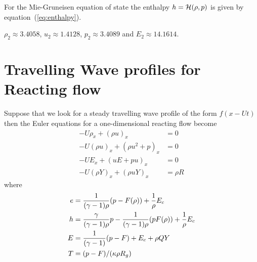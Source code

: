 \documentclass{article}
\begin{document}
For the 
Mie-Gruneisen equation of state the enthalpy $h={\mathcal H}(\rho,p)$ is given by equation~(\ref{eq:enthalpy}).

% 

$\rho_2\approx 3.4058$, $u_2\approx 1.4128$, $p_2\approx 3.4089$ and $E_2\approx 14.1614$.

\clearpage
\section{Travelling Wave profiles for Reacting flow}

Suppose that we look for a steady travelling wave profile of the form $f(x-Ut)$ then the
Euler equations for a one-dimensional reacting flow become
\begin{align*}
  - U \rho_x + (\rho u)_x &=0 \\
  -U (\rho u)_x + (\rho u^2 + p )_x &= 0 \\
  -U E_x + ( uE + pu)_x &=0   \\
  -U (\rho Y)_x + (\rho u Y)_x &= \rho R
\end{align*}
where
\begin{align*}
    e &= {1\over (\gamma-1)\rho} (p - F(\rho) ) + {1 \over \rho} E_c \\
    h &= {\gamma\over (\gamma-1)\rho} p  - {1\over (\gamma-1)\rho} (pF(\rho) ) + {1 \over \rho} E_c \\
    E &= {1\over (\gamma-1)} (p-F) + E_c + \rho Q Y \\
    T &= (p-F)/(\kappa \rho R_g)
\end{align*}
\end{document}
